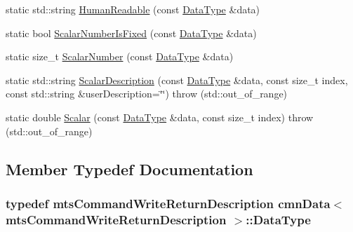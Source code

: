 \begin{DoxyCompactItemize}
\item 
static std\+::string \hyperlink{classcmn_data_3_01mts_command_write_return_description_01_4_ac0b11c735704b9c2f5f460b4a15b542e}{Human\+Readable} (const \hyperlink{classcmn_data_3_01mts_command_write_return_description_01_4_abe59247ead6cb32213ea0a76d9ae56a6}{Data\+Type} \&data)
\item 
static bool \hyperlink{classcmn_data_3_01mts_command_write_return_description_01_4_adfc803aff56ac9d3f82e0d6f0596379a}{Scalar\+Number\+Is\+Fixed} (const \hyperlink{classcmn_data_3_01mts_command_write_return_description_01_4_abe59247ead6cb32213ea0a76d9ae56a6}{Data\+Type} \&data)
\item 
static size\+\_\+t \hyperlink{classcmn_data_3_01mts_command_write_return_description_01_4_a3c97c4333986f576d605bfa7dcc77a70}{Scalar\+Number} (const \hyperlink{classcmn_data_3_01mts_command_write_return_description_01_4_abe59247ead6cb32213ea0a76d9ae56a6}{Data\+Type} \&data)
\item 
static std\+::string \hyperlink{classcmn_data_3_01mts_command_write_return_description_01_4_a66d43bd319dc19a8f9e64f9206568546}{Scalar\+Description} (const \hyperlink{classcmn_data_3_01mts_command_write_return_description_01_4_abe59247ead6cb32213ea0a76d9ae56a6}{Data\+Type} \&data, const size\+\_\+t index, const std\+::string \&user\+Description=\char`\"{}\char`\"{})  throw (std\+::out\+\_\+of\+\_\+range)
\item 
static double \hyperlink{classcmn_data_3_01mts_command_write_return_description_01_4_a78fc22ae5d78ee90439a4d7814832481}{Scalar} (const \hyperlink{classcmn_data_3_01mts_command_write_return_description_01_4_abe59247ead6cb32213ea0a76d9ae56a6}{Data\+Type} \&data, const size\+\_\+t index)  throw (std\+::out\+\_\+of\+\_\+range)
\end{DoxyCompactItemize}


\subsection{Member Typedef Documentation}
\hypertarget{classcmn_data_3_01mts_command_write_return_description_01_4_abe59247ead6cb32213ea0a76d9ae56a6}{}
\subsubsection[{Data\+Type}]{\setlength{\rightskip}{0pt plus 5cm}typedef {\bf mts\+Command\+Write\+Return\+Description} {\bf cmn\+Data}$<$ {\bf mts\+Command\+Write\+Return\+Description} $>$\+::{\bf Data\+Type}}\label{classcmn_data_3_01mts_command_write_return_description_01_4_abe59247ead6cb32213ea0a76d9ae56a6}



